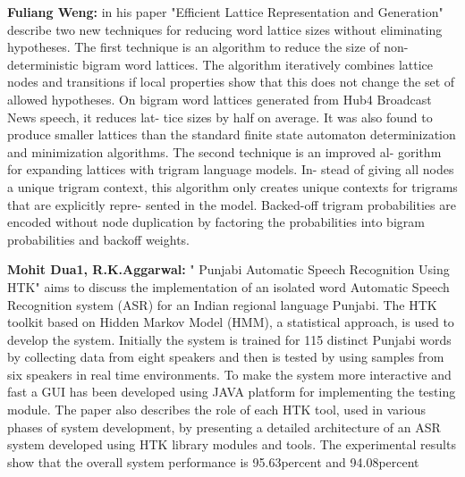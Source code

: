 \documentclass[12pt,a4paper,oldfontcommands]{memoir}
\begin{document}
\textbf{Fuliang Weng:} in his paper "Efficient Lattice Representation and Generation" 
describe two
new techniques for reducing word lattice sizes without eliminating
hypotheses. The first technique is an algorithm to reduce the size of
non-deterministic bigram word lattices. The algorithm iteratively
combines lattice nodes and transitions if local properties show that
this does not change the set of allowed hypotheses. On bigram word
lattices generated from Hub4 Broadcast News speech, it reduces lat-
tice sizes by half on average. It was also found to produce smaller
lattices than the standard finite state automaton determinization and
minimization algorithms. The second technique is an improved al-
gorithm for expanding lattices with trigram language models. In-
stead of giving all nodes a unique trigram context, this algorithm
only creates unique contexts for trigrams that are explicitly repre-
sented in the model. Backed-off trigram probabilities are encoded
without node duplication by factoring the probabilities into bigram
probabilities and backoff weights.     

\textbf{Mohit Dua1, R.K.Aggarwal:}  " Punjabi Automatic Speech Recognition Using HTK" aims to discuss the implementation of an isolated
word Automatic Speech Recognition system (ASR) for an
Indian regional language Punjabi. The HTK toolkit based on
Hidden Markov Model (HMM), a statistical approach, is used
to develop the system. Initially the system is trained for 115
distinct Punjabi words by collecting data from eight speakers
and then is tested by using samples from six speakers in real
time environments. To make the system more interactive and
fast a GUI has been developed using JAVA platform for
implementing the testing module. The paper also describes the
role of each HTK tool, used in various phases of system
development, by presenting a detailed architecture of an ASR
system developed using HTK library modules and tools. The
experimental results show that the overall system performance
is 95.63percent and 94.08percent       
\end{document}

